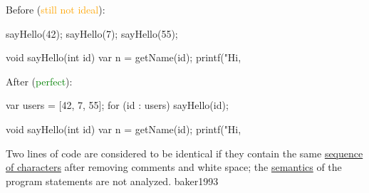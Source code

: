 \documentclass{article}
\begin{document}
\begin{multicols}{2}
Before (\textcolor{orange}{still not ideal}):\par
{\small\begin{ffcode}
sayHello(42);
sayHello(7);
sayHello(55);

void sayHello(int id) {
  var n = getName(id);
  printf("Hi, %
}
\end{ffcode}
}
\par\columnbreak\par
After (\textcolor{green}{perfect}):\par
{\small\begin{ffcode}
var users = [42, 7, 55];
for (id : users) {
  sayHello(id);
}

void sayHello(int id) {
  var n = getName(id);
  printf("Hi, %
}
\end{ffcode}
}
\end{multicols}
\plush{}

  {Two lines of code are considered to be identical if they contain the same \ul{sequence of characters} after removing comments and white space; the \ul{semantics} of the program statements are not analyzed.}
  {baker1993}

\end{document}
